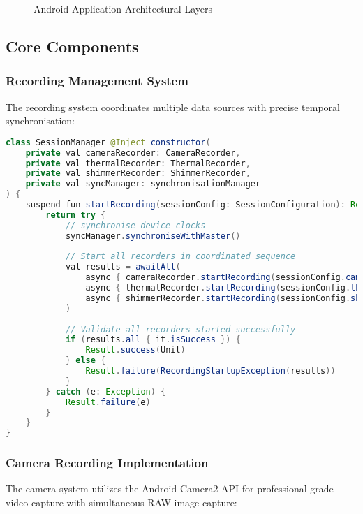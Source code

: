 \documentclass[11pt,a4paper]{report}
\begin{document}
\begin{figure}[ht]
\centering
\framebox[0.9\textwidth][c]{\rule{0pt}{4cm}}
\caption{Android Application Architectural Layers}
\label{fig:android-layers}
\end{figure}

\subsection{Core Components}

\subsubsection{Recording Management System}

The recording system coordinates multiple data sources with precise temporal synchronisation:

\begin{lstlisting}[language=Java]
class SessionManager @Inject constructor(
    private val cameraRecorder: CameraRecorder,
    private val thermalRecorder: ThermalRecorder,
    private val shimmerRecorder: ShimmerRecorder,
    private val syncManager: synchronisationManager
) {
    suspend fun startRecording(sessionConfig: SessionConfiguration): Result<Unit> {
        return try {
            // synchronise device clocks
            syncManager.synchroniseWithMaster()
            
            // Start all recorders in coordinated sequence
            val results = awaitAll(
                async { cameraRecorder.startRecording(sessionConfig.cameraConfig) },
                async { thermalRecorder.startRecording(sessionConfig.thermalConfig) },
                async { shimmerRecorder.startRecording(sessionConfig.shimmerConfig) }
            )
            
            // Validate all recorders started successfully
            if (results.all { it.isSuccess }) {
                Result.success(Unit)
            } else {
                Result.failure(RecordingStartupException(results))
            }
        } catch (e: Exception) {
            Result.failure(e)
        }
    }
}
\end{lstlisting}

\subsubsection{Camera Recording Implementation}

The camera system utilizes the Android Camera2 API for professional-grade video capture with simultaneous RAW image capture:
\end{document}
